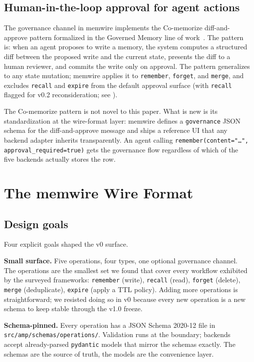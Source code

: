 \documentclass[11pt,letterpaper,twocolumn]{article}
\begin{document}
\subsection{Human-in-the-loop approval for agent actions}

The governance channel in memwire implements the Co-memorize diff-and-approve pattern formalized in the Governed Memory line of work~\cite{taheri2026governed}. The pattern is: when an agent proposes to write a memory, the system computes a structured diff between the proposed write and the current state, presents the diff to a human reviewer, and commits the write only on approval. The pattern generalizes to any state mutation; memwire applies it to \texttt{remember}, \texttt{forget}, and \texttt{merge}, and excludes \texttt{recall} and \texttt{expire} from the default approval surface (with \texttt{recall} flagged for v0.2 reconsideration; see ).

The Co-memorize pattern is not novel to this paper. What is new is its standardization at the wire-format layer: memwire defines a \texttt{governance} JSON schema for the diff-and-approve message and ships a reference UI that any backend adapter inherits transparently. An agent calling \texttt{remember(content="\ldots", approval\_required=true)} gets the governance flow regardless of which of the five backends actually stores the row.

\section{The memwire Wire Format}
\label{sec:spec}

\subsection{Design goals}
\label{sec:spec-goals}

Four explicit goals shaped the v0 surface.

\textbf{Small surface.} Five operations, four types, one optional governance channel. The operations are the smallest set we found that cover every workflow exhibited by the surveyed frameworks: \texttt{remember} (write), \texttt{recall} (read), \texttt{forget} (delete), \texttt{merge} (deduplicate), \texttt{expire} (apply a TTL policy). Adding more operations is straightforward; we resisted doing so in v0 because every new operation is a new schema to keep stable through the v1.0 freeze.

\textbf{Schema-pinned.} Every operation has a JSON Schema 2020-12 file in \texttt{src/amp/schemas/operations/}. Validation runs at the boundary; backends accept already-parsed \texttt{pydantic} models that mirror the schemas exactly. The schemas are the source of truth, the models are the convenience layer.
\end{document}
